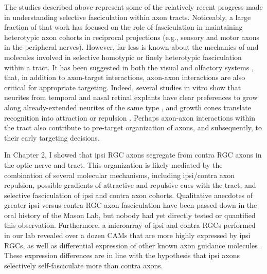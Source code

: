 The studies described above represent some of the relatively recent progress made in understanding selective fasciculation within axon tracts.
Noticeably, a large fraction of that work has focused on the role of fasciculation in maintaining heterotypic axon cohorts in reciprocal projections (e.g., sensory and motor axons in the peripheral nerves).
However, far less is known about the mechanics of and molecules involved in selective homotypic or finely heterotypic fasciculation within a tract.
It has been suggested in both the visual \cite{weth2014chemoaffinity} and olfactory systems \cite{ebrahimi2000olfactory,imai2011axon}, that, in addition to axon-target interactions, axon-axon interactions are also critical for appropriate targeting.
Indeed, several studies in vitro show that neurites from temporal and nasal retinal explants have clear preferences to grow along already-extended neurites of the same type \cite{bonhoeffer1985position}, and growth cones translate recognition into attraction or repulsion \cite{raper1990temporal,fan1995localized}. 
Perhaps axon-axon interactions within the tract also contribute to pre-target organization of axons, and subsequently, to their early targeting decisions.

In Chapter 2, I showed that ipsi RGC axons segregate from contra RGC axons in the optic nerve and tract.
This organization is likely mediated by the combination of several molecular mechanisms, including ipsi/contra axon repulsion, possible gradients of attractive and repulsive cues with the tract, and selective fasciculation of ipsi and contra axon cohorts.
Qualitative anecdotes of greater ipsi versus contra RGC axon fasciculation have been passed down in the oral history of the Mason Lab, but nobody had yet directly tested or quantified this observation.
Furthermore, a microarray of ipsi and contra RGCs performed in our lab revealed over a dozen CAMs that are more highly expressed by ipsi RGCs, as well as differential expression of other known axon guidance molecules \cite{wang2016ipsilateral}.
These expression differences are in line with the hypothesis that ipsi axons selectively self-fasciculate more than contra axons.

